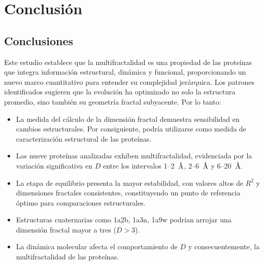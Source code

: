 \chapter{Conclusión}


	\section{Conclusiones}

Este estudio establece que la multifractalidad es una propiedad de las prote\'{i}nas que integra 
informaci\'{o}n estructural, din\'{a}mica y funcional, proporcionando un nuevo marco cuantitativo 
para entender su complejidad jer\'{a}rquica. Los patrones identificados sugieren que la evoluci\'{o}n 
ha optimizado no solo la estructura promedio, sino tambi\'{e}n su geometr\'{i}a fractal subyacente. 
Por lo tanto:

\begin{itemize}
	\item La medida del c\'{a}lculo de la dimensi\'{o}n fractal demuestra sensibilidad en
	 cambios estructurales. Por consiguiente, podr\'{i}a utilizarse como medida de caracterizaci\'{o}n 
	 estructural de las prote\'{i}nas.
	
	\item Las nueve prote\'{i}nas analizadas exhiben multifractalidad, evidenciada por la variaci\'{o}n 
	significativa en $D$ entre los intervalos 1--2~$\textup{\r{A}}$, 2--6~$\textup{\r{A}}$ y 6--20~$\textup{\r{A}}$.
	
	\item La etapa de equilibrio presenta la mayor estabilidad, con valores altos de $R^2$ y 
	dimensiones fractales consistentes, constituyendo un punto de referencia \'{o}ptimo para comparaciones estructurales.
	
	\item Estructuras cuaternarias como 1a2b, 1a3n, 1a9w podr\'{i}an arrojar una dimensi\'{o}n fractal mayor a tres ($D>3$).
	
	
	\item La din\'{a}mica molecular afecta el comportamiento de $D$ y consecuentemente, la multifractalidad de las prote\'{i}nas.
\end{itemize}
